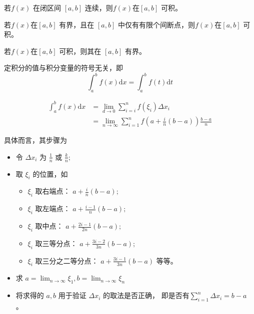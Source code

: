 \begin{Theo}[连续必可积]

    若$ f(x) $ 在闭区间 $ [a,b] $ 连续，则$ f(x) $在$ [a,b] $ 可积。
\end{Theo}

\begin{Theo}[]

    若$ f(x) $在$ [a,b] $ 有界，且在 $ [a,b] $ 中仅有有限个间断点，则$ f(x) $在$ [a,b] $ 可积。
\end{Theo}

\begin{Theo}[可积必有界]

    若$ f(x) $在$ [a,b] $ 可积，则其在 $ [a,b] $ 有界。
\end{Theo}

\begin{Theo}[定积分值的变量符号无关性]

    定积分的值与积分变量的符号无关，即$$
        \int_a^b f(x)\mathrm{d}x=\int_a^b f(t)\mathrm{d}t
    $$ 
\end{Theo}


\begin{equation*}
    \begin{aligned}
        \int_a^b f(x)\mathrm{d}x&={\displaystyle\lim_{d\rightarrow 0}}\sum_{i=i}^nf(\xi_i)\Delta x_i\\
        &={\displaystyle\lim_{n\rightarrow \infty}}\sum_{i=1}^n f(a+\frac{i}{n}(b-a))\frac{b-a}{n}
    \end{aligned}
\end{equation*}

具体而言，其步骤为
\begin{itemize}
    \item 令 $ \Delta x_i $ 为 $ \frac{1}{n} $ 或 $ \frac{k}{n} ; $
    \item 取 $ \xi_i $ 的位置，如\begin{itemize}
        \item $ \xi_i $ 取右端点： $ a+\frac{i}{n}(b-a) ; $
        \item $ \xi_i $ 取左端点： $ a+\frac{i-1}{n}(b-a) ; $
        \item $ \xi_i $ 取中点： $ a+\frac{2i-1}{2n}(b-a) ; $
        \item $ \xi_i $ 取三等分点： $ a+\frac{3i-2}{3n}(b-a) ; $
        \item $ \xi_i $ 取三分之二等分点： $ a+\frac{3i-1}{3n}(b-a) $ 等等。
    \end{itemize}
    \item 求 $ a={\displaystyle\lim_{n\rightarrow \infty}}\xi_1,b={\displaystyle\lim_{n\rightarrow \infty}}\xi_n $
    \item 将求得的 $ a,b $ 用于验证 $ \Delta x_i $ 的取法是否正确，
    即是否有$ \sum_{i=1}^n \Delta x_i = b-a $ 。
\end{itemize}

